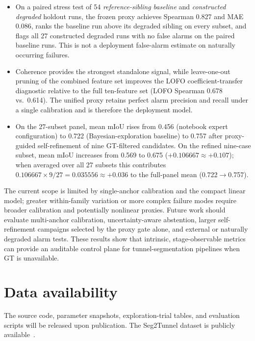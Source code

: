 \documentclass[a4paper,fleqn]{cas-dc}
\begin{document}
{\begin{itemize}
\item On a paired stress test of 54 \emph{reference-sibling baseline} and \emph{constructed degraded} holdout runs, the frozen proxy achieves Spearman 0.827 and MAE 0.086, ranks the baseline run above its degraded sibling on every subset, and flags all 27 constructed degraded runs with no false alarms on the paired baseline runs. This is not a deployment false-alarm estimate on naturally occurring failures.
\item Coherence provides the strongest standalone signal, while leave-one-out pruning of the combined feature set improves the LOFO coefficient-transfer diagnostic relative to the full ten-feature set (LOFO Spearman 0.678 vs.\ 0.614). The unified proxy retains perfect alarm precision and recall under a single calibration and is therefore the deployment model.
\item On the 27-subset panel, mean mIoU rises from 0.456 (notebook expert configuration) to 0.722 (Bayesian-exploration baseline) to 0.757 after proxy-guided self-refinement of nine GT-filtered candidates. On the refined nine-case subset, mean mIoU increases from 0.569 to 0.675 ($+0.106667\approx{+}0.107$); when averaged over all 27 subsets this contributes $0.106667\times 9/27=0.035556\approx{+}0.036$ to the full-panel mean (0.722$\rightarrow$0.757).
\end{itemize}

The current scope is limited by single-anchor calibration and the compact linear model; greater within-family variation or more complex failure modes require broader calibration and potentially nonlinear proxies. Future work should evaluate multi-anchor calibration, uncertainty-aware abstention, larger self-refinement campaigns selected by the proxy gate alone, and external or naturally degraded alarm tests. These results show that intrinsic, stage-observable metrics can provide an auditable control plane for tunnel-segmentation pipelines when GT is unavailable.


\section*{Data availability}

The source code, parameter snapshots, exploration-trial tables, and evaluation scripts will be released upon publication. The Seg2Tunnel dataset is publicly available~\cite{lin2024seg2tunnel}.

}
\end{document}
